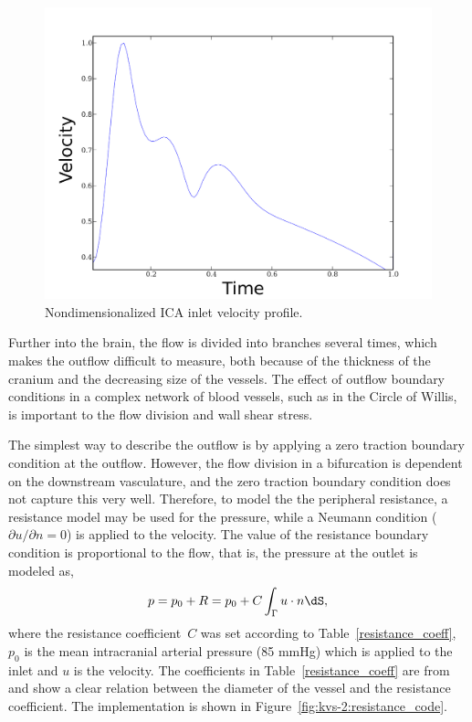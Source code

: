 \begin{figure}
  \center\includegraphics[width=\largefig]{chapters/kvs-2/pdf/systolic.pdf}
   \caption{Nondimensionalized ICA inlet velocity profile.}
\label{fig:kvs-2:ford}
\end{figure}

Further into the brain, the flow is divided into branches several
times, which makes the outflow difficult to measure, both because of
the thickness of the cranium and the decreasing size of the vessels.
The effect of outflow boundary conditions in a complex network of
blood vessels, such as in the Circle of Willis, is important to the
flow division and wall shear stress.

The simplest way to describe the outflow is by applying a zero
traction boundary condition at the outflow. However, the flow division
in a bifurcation is dependent on the downstream vasculature, and the
zero traction boundary condition does not capture this very
well. Therefore, to model the the peripheral resistance, a resistance
model may be used for the pressure, while a Neumann condition
(${\partial u / \partial n} = 0 $) is applied to the velocity. The
value of the resistance boundary condition is proportional to the
flow, that is, the pressure at the outlet is modeled as,
\begin{equation}
  p = p_0 + R = p_0 + C \int_\Gamma u \cdot n \dS,
\end{equation}
where the resistance coefficient~$C$ was set according to
Table~\ref{resistance_coeff}, $p_0$ is the mean intracranial arterial
pressure (85 mmHg) which is applied to the inlet and $u$ is the
velocity. The coefficients in Table~\ref{resistance_coeff} are
from \citet{AlastrueyParkerPeiroEtAl2007} and show a clear relation
between the diameter of the vessel and the resistance coefficient. The
implementation is shown in Figure~\ref{fig:kvs-2:resistance_code}.

